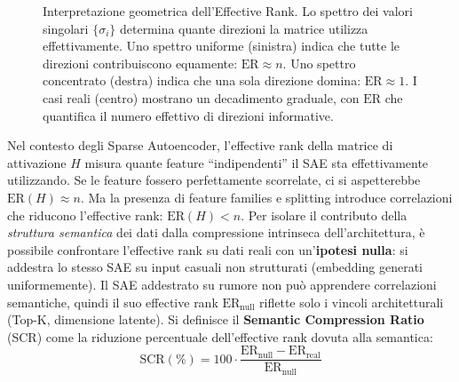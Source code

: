 \begin{figure}[htbp]
    \caption{Interpretazione geometrica dell'Effective Rank. Lo spettro dei valori singolari $\{\sigma_i\}$ determina quante direzioni la matrice utilizza effettivamente. Uno spettro uniforme (sinistra) indica che tutte le direzioni contribuiscono equamente: $\text{ER} \approx n$. Uno spettro concentrato (destra) indica che una sola direzione domina: $\text{ER} \approx 1$. I casi reali (centro) mostrano un decadimento graduale, con $\text{ER}$ che quantifica il numero effettivo di direzioni informative.}
    \label{fig:effective_rank_spectrum}
\end{figure}
Nel contesto degli Sparse Autoencoder, l'effective rank della matrice di attivazione $H$ misura quante feature ``indipendenti'' il SAE sta effettivamente utilizzando. Se le feature fossero perfettamente scorrelate, ci si aspetterebbe $\text{ER}(H) \approx n$. Ma la presenza di feature families e splitting introduce correlazioni che riducono l'effective rank: $\text{ER}(H) < n$.
Per isolare il contributo della \textit{struttura semantica} dei dati dalla compressione intrinseca dell'architettura, è possibile confrontare l'effective rank su dati reali con un'\textbf{ipotesi nulla}: si addestra lo stesso SAE su input casuali non strutturati (embedding generati uniformemente). Il SAE addestrato su rumore non può apprendere correlazioni semantiche, quindi il suo effective rank $\text{ER}_{\text{null}}$ riflette solo i vincoli architetturali (Top-K, dimensione latente).
Si definisce il \textbf{Semantic Compression Ratio} (SCR) come la riduzione percentuale dell'effective rank dovuta alla semantica:
\begin{equation}
    \text{SCR}(\%) = 100 \cdot \frac{\text{ER}_{\text{null}} - \text{ER}_{\text{real}}}{\text{ER}_{\text{null}}}
    \label{eq:scr}
\end{equation}

